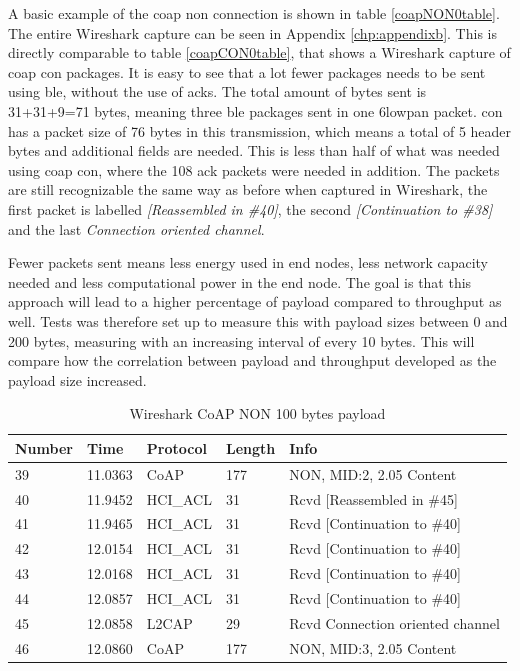 \noindent A basic example of the \gls{coap} \gls{non} connection is shown in table \ref{coapNON0table}. The entire Wireshark capture can be seen in Appendix \ref{chp:appendixb}. This is directly comparable to table \ref{coapCON0table}, that shows a Wireshark capture of \gls{coap} \gls{con} packages. It is easy to see that a lot fewer packages needs to be sent using \gls{ble}, without the use of \glspl{ack}. The total amount of bytes sent is 31+31+9=71 bytes, meaning three \gls{ble} packages sent in one \gls{6lowpan} packet. \gls{con} has a packet size of 76 bytes in this transmission, which means a total of 5 header bytes and additional fields are needed. This is less than half of what was needed using \gls{coap} \gls{con}, where the 108 \gls{ack} packets were needed in addition. The packets are still recognizable the same way as before when captured in Wireshark, the first packet is labelled \textit{[Reassembled in \#40]}, the second \textit{[Continuation to \#38]} and the last \textit{Connection oriented channel}.

\noindent Fewer packets sent means less energy used in end nodes, less network capacity needed and less computational power in the end node. The goal is that this approach will lead to a higher percentage of \gls{payload} compared to throughput as well. Tests was therefore set up to measure this with \gls{payload} sizes between 0 and 200 bytes, measuring with an increasing interval of every 10 bytes. This will compare how the correlation between \gls{payload} and \gls{throughput} developed as the \gls{payload} size increased.

\begin{table}[H]
\small
\centering
\caption{Wireshark CoAP NON 100 bytes payload}
\label{coapNON100table}
\begin{tabular}{lllll}
\hline
Number & Time    & Protocol & Length & Info   							  \\ \hline                          
39     & 11.0363 & CoAP     & 177    & NON, MID:2, 2.05 Content         \\
40     & 11.9452 & HCI\_ACL & 31     & Rcvd {[}Reassembled in \#45{]}   \\
41     & 11.9465 & HCI\_ACL & 31     & Rcvd {[}Continuation to \#40{]}  \\
42     & 12.0154 & HCI\_ACL & 31     & Rcvd {[}Continuation to \#40{]}  \\
43     & 12.0168 & HCI\_ACL & 31     & Rcvd {[}Continuation to \#40{]}  \\
44     & 12.0857 & HCI\_ACL & 31     & Rcvd {[}Continuation to \#40{]}  \\
45     & 12.0858 & L2CAP    & 29     & Rcvd Connection oriented channel \\
46     & 12.0860 & CoAP     & 177    & NON, MID:3, 2.05 Content         \\ \hline
\end{tabular}
\end{table}

